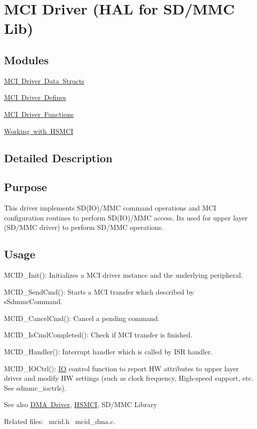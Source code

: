 \hypertarget{group__mcid__module}{}\section{M\+CI Driver (H\+AL for S\+D/\+M\+MC Lib)}
\label{group__mcid__module}
\subsection*{Modules}
\begin{DoxyCompactItemize}
\item 
\mbox{\hyperlink{group__mcid__structs}{M\+C\+I Driver Data Structs}}
\item 
\mbox{\hyperlink{group__mcid__defines}{M\+C\+I Driver Defines}}
\item 
\mbox{\hyperlink{group__mcid__functions}{M\+C\+I Driver Functions}}
\item 
\mbox{\hyperlink{group__hsmci__module}{Working with H\+S\+M\+CI}}
\end{DoxyCompactItemize}


\subsection{Detailed Description}
\hypertarget{group__RTEMSBSPsARM_Purpose}{}\subsection{Purpose}\label{group__RTEMSBSPsARM_Purpose}
This driver implements S\+D(\+I\+O)/\+M\+MC command operations and M\+CI configuration routines to perform S\+D(\+I\+O)/\+M\+MC access. It\textquotesingle{}s used for upper layer (S\+D/\+M\+MC driver) to perform S\+D/\+M\+MC operations.\hypertarget{group__RTEMSBSPsARM_Usage}{}\subsection{Usage}\label{group__RTEMSBSPsARM_Usage}

\begin{DoxyEnumerate}
\item M\+C\+I\+D\+\_\+\+Init()\+: Initializes a M\+CI driver instance and the underlying peripheral.
\item M\+C\+I\+D\+\_\+\+Send\+Cmd()\+: Starts a M\+CI transfer which described by s\+Sdmmc\+Command.
\item M\+C\+I\+D\+\_\+\+Cancel\+Cmd()\+: Cancel a pending command.
\item M\+C\+I\+D\+\_\+\+Is\+Cmd\+Completed()\+: Check if M\+CI transfer is finished.
\item M\+C\+I\+D\+\_\+\+Handler()\+: Interrupt handler which is called by I\+SR handler.
\item M\+C\+I\+D\+\_\+\+I\+O\+Ctrl()\+: \mbox{\hyperlink{structIO}{IO}} control function to report HW attributes to upper layer driver and modify HW settings (such as clock frequency, High-\/speed support, etc. See sdmmc\+\_\+ioctrls).
\end{DoxyEnumerate}

\begin{DoxySeeAlso}{See also}
\mbox{\hyperlink{group__dmad__module}{D\+MA Driver}}, \mbox{\hyperlink{group__hsmci__module}{H\+S\+M\+CI}}, S\+D/\+M\+MC Library
\end{DoxySeeAlso}
Related files\+:~\newline
mcid.\+h~\newline
 mcid\+\_\+dma.\+c.~\newline
 